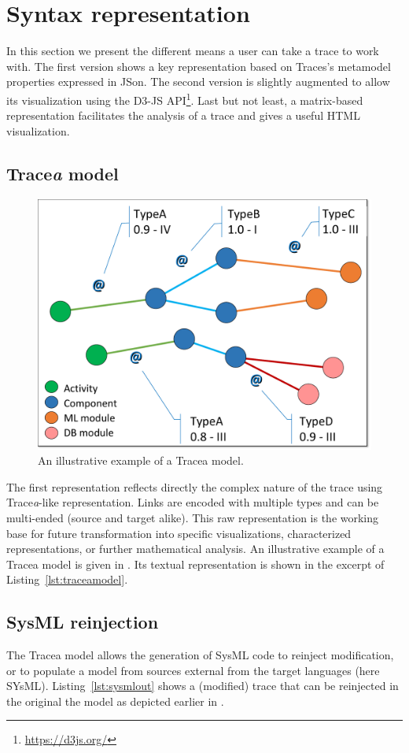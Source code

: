 \section{Syntax representation}\label{sec:syntaxrepr}

In this section we present the different means a user can take a trace to work with. The first version shows a key representation based on Traces's metamodel properties expressed in JSon. The second version is slightly augmented to allow its visualization using the D3-JS API\footnote{\url{https://d3js.org/}}. Last but not least, a matrix-based representation facilitates the analysis of a trace and gives a useful HTML visualization.

\subsection{Trace\textit{a} model}
\label{sec:traceamodel}
\begin{figure}[ht]
	\centering
	\includegraphics[width=.5\linewidth]{images/energy3.pdf}
	\caption{An illustrative example of a Tracea model.}
	\label{fig:traceamodel}
\end{figure} 
The first representation reflects directly the complex nature of the trace using Trace\textit{a}-like representation. Links are encoded with multiple types and can be multi-ended (source and target alike). This raw representation is the working base for future transformation into specific visualizations, characterized representations, or further mathematical analysis. An illustrative example of a Tracea model is given in . Its textual representation is shown in the excerpt of Listing~\ref{lst:traceamodel}.



\subsection{SysML reinjection}
The Tracea model allows the generation of SysML code to reinject modification, or to populate a model from sources external from the target languages (here SYsML). Listing~\ref{lst:sysmlout} shows a (modified) trace that can be reinjected in the original the model as depicted earlier in .


